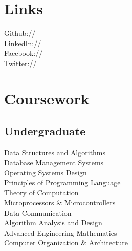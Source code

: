 \documentclass[]{deedy-resume-openfont}
\begin{document}
\begin{minipage}[t]{0.33\textwidth}
\section{Links} 
\faGithub \hspace{0mm} Github:// \href{https://github.com/nguptaa}{} \\
\faLinkedinSquare \hspace{0mm} LinkedIn://  \href{https://www.linkedin.com/in/nguptaa}{} \\
\faFacebookSquare \hspace{0mm} Facebook://  \href{https://facebook.com/nguptaa183}{} \\
\faTwitter \hspace{0mm} Twitter://  \href{https://twitter.com/ngupta183}{} \\
\sectionsep


\section{Coursework}

\subsection{Undergraduate}
Data Structures and Algorithms \\
Database Management Systems\\
Operating Systems Design\\
Principles of Programming Language\\
Theory of Computation\\
Microprocessors \& Microcontrollers\\ 
Data Communication\\
Algorithm Analysis and Design\\
Advanced Engineering Mathematics\\
Computer Organization \& Architecture\\


\end{minipage}
\end{document}
